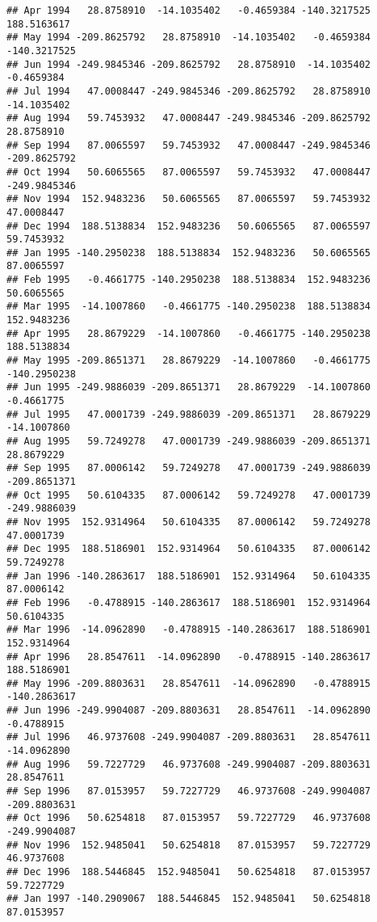 \documentclass[]{article}
\begin{document}
\begin{verbatim}
## Apr 1994   28.8758910  -14.1035402   -0.4659384 -140.3217525  188.5163617
## May 1994 -209.8625792   28.8758910  -14.1035402   -0.4659384 -140.3217525
## Jun 1994 -249.9845346 -209.8625792   28.8758910  -14.1035402   -0.4659384
## Jul 1994   47.0008447 -249.9845346 -209.8625792   28.8758910  -14.1035402
## Aug 1994   59.7453932   47.0008447 -249.9845346 -209.8625792   28.8758910
## Sep 1994   87.0065597   59.7453932   47.0008447 -249.9845346 -209.8625792
## Oct 1994   50.6065565   87.0065597   59.7453932   47.0008447 -249.9845346
## Nov 1994  152.9483236   50.6065565   87.0065597   59.7453932   47.0008447
## Dec 1994  188.5138834  152.9483236   50.6065565   87.0065597   59.7453932
## Jan 1995 -140.2950238  188.5138834  152.9483236   50.6065565   87.0065597
## Feb 1995   -0.4661775 -140.2950238  188.5138834  152.9483236   50.6065565
## Mar 1995  -14.1007860   -0.4661775 -140.2950238  188.5138834  152.9483236
## Apr 1995   28.8679229  -14.1007860   -0.4661775 -140.2950238  188.5138834
## May 1995 -209.8651371   28.8679229  -14.1007860   -0.4661775 -140.2950238
## Jun 1995 -249.9886039 -209.8651371   28.8679229  -14.1007860   -0.4661775
## Jul 1995   47.0001739 -249.9886039 -209.8651371   28.8679229  -14.1007860
## Aug 1995   59.7249278   47.0001739 -249.9886039 -209.8651371   28.8679229
## Sep 1995   87.0006142   59.7249278   47.0001739 -249.9886039 -209.8651371
## Oct 1995   50.6104335   87.0006142   59.7249278   47.0001739 -249.9886039
## Nov 1995  152.9314964   50.6104335   87.0006142   59.7249278   47.0001739
## Dec 1995  188.5186901  152.9314964   50.6104335   87.0006142   59.7249278
## Jan 1996 -140.2863617  188.5186901  152.9314964   50.6104335   87.0006142
## Feb 1996   -0.4788915 -140.2863617  188.5186901  152.9314964   50.6104335
## Mar 1996  -14.0962890   -0.4788915 -140.2863617  188.5186901  152.9314964
## Apr 1996   28.8547611  -14.0962890   -0.4788915 -140.2863617  188.5186901
## May 1996 -209.8803631   28.8547611  -14.0962890   -0.4788915 -140.2863617
## Jun 1996 -249.9904087 -209.8803631   28.8547611  -14.0962890   -0.4788915
## Jul 1996   46.9737608 -249.9904087 -209.8803631   28.8547611  -14.0962890
## Aug 1996   59.7227729   46.9737608 -249.9904087 -209.8803631   28.8547611
## Sep 1996   87.0153957   59.7227729   46.9737608 -249.9904087 -209.8803631
## Oct 1996   50.6254818   87.0153957   59.7227729   46.9737608 -249.9904087
## Nov 1996  152.9485041   50.6254818   87.0153957   59.7227729   46.9737608
## Dec 1996  188.5446845  152.9485041   50.6254818   87.0153957   59.7227729
## Jan 1997 -140.2909067  188.5446845  152.9485041   50.6254818   87.0153957

\end{verbatim}
\end{document}
